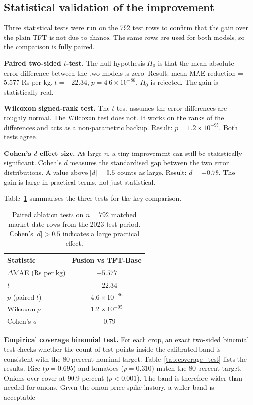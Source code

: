 \documentclass[conference,twoside]{IEEEtran}
\begin{document}
\subsection{Statistical validation of the improvement}
\label{sec:stat_proof}
Three statistical tests were run on the 792 test rows to confirm that the gain over the plain TFT is not due to chance. The same rows are used for both models, so the comparison is fully paired.

\textbf{Paired two-sided $t$-test.} The null hypothesis $H_0$ is that the mean absolute-error difference between the two models is zero. Result: mean MAE reduction = 5.577 Rs per kg, $t = -22.34$, $p = 4.6 \times 10^{-86}$. $H_0$ is rejected. The gain is statistically real.

\textbf{Wilcoxon signed-rank test.} The $t$-test assumes the error differences are roughly normal. The Wilcoxon test does not. It works on the ranks of the differences and acts as a non-parametric backup. Result: $p = 1.2 \times 10^{-95}$. Both tests agree.

\textbf{Cohen's $d$ effect size.} At large $n$, a tiny improvement can still be statistically significant. Cohen's $d$ measures the standardised gap between the two error distributions. A value above $|d| = 0.5$ counts as large. Result: $d = -0.79$. The gain is large in practical terms, not just statistical.

Table~\ref{tab:stat_tests} summarises the three tests for the key comparison.

\begin{table}[H]
\centering
\caption{Paired ablation tests on $n = 792$ matched market-date rows from the 2023 test period. Cohen's $|d| > 0.5$ indicates a large practical effect.}
\label{tab:stat_tests}
\begin{tabular}{lc}
\toprule
\textbf{Statistic} & \textbf{Fusion vs TFT-Base} \\
\midrule
$\Delta$MAE (Rs per kg) & $-5.577$ \\
$t$                 & $-22.34$ \\
$p$ (paired $t$)    & $4.6 \times 10^{-86}$ \\
Wilcoxon $p$        & $1.2 \times 10^{-95}$ \\
Cohen's $d$         & $-0.79$ \\
\bottomrule
\end{tabular}
\end{table}

\textbf{Empirical coverage binomial test.} For each crop, an exact two-sided binomial test checks whether the count of test points inside the calibrated band is consistent with the 80 percent nominal target. Table~\ref{tab:coverage_test} lists the results. Rice ($p = 0.695$) and tomatoes ($p = 0.310$) match the 80 percent target. Onions over-cover at 90.9 percent ($p < 0.001$). The band is therefore wider than needed for onions. Given the onion price spike history, a wider band is acceptable.
\end{document}
